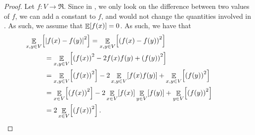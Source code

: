 \begin{proof}
    Let $f:V\rightarrow \Re$. Since in , we only look
    on the difference between two values of $f$, we can add a constant
    to $f$, and would not change the quantities involved in
    . As such, we assume that $\mathop{\mathbb{E}}\!\left[ {f(x)} \right]=0$. As such,
    we have that
    \begin{align}
        \eqlab{reduction:1} &\hspace{-1cm} \ExExt{x,y \in
           V}{\cardin{f(x)- f(y)}^2} = \ExExt{x,y \in V}{\pth[]{f(x)-
              f(y)}^2}
        \\ \nonumber
        &=%
        \ExExt{x,y \in V}{\pth[]{f(x)}^2 -2 f(x) f(y) + \pth{f(y)}^2}
        \\
        &=%
        \ExExt{x,y \in V}{\pth[]{f(x)}^2} -2 \ExExt{x,y \in V}{ f(x)
           f(y)}
        + \ExExt{x,y \in V}{\pth[]{f(y)}^2}    
        \nonumber\\
        \nonumber
        &=%
        \ExExt{x \in V}{\pth[]{f(x)}^2} -2 \ExExt{x \in V}{ f(x)}
        \ExExt{y \in V}{f(y)}
        + \ExExt{y \in V}{\pth[]{f(y)}^2}    
        \\ \nonumber
        &= 2 \ExExt{x \in V}{\pth[]{f(x)}^2}.
    \end{align}
    

\end{proof}
